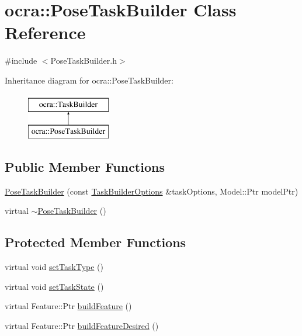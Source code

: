 \hypertarget{classocra_1_1PoseTaskBuilder}{}\section{ocra\+:\+:Pose\+Task\+Builder Class Reference}
\label{classocra_1_1PoseTaskBuilder}


{\ttfamily \#include $<$Pose\+Task\+Builder.\+h$>$}

Inheritance diagram for ocra\+:\+:Pose\+Task\+Builder\+:\begin{figure}[H]
\begin{center}
\leavevmode
\includegraphics[height=2.000000cm]{dc/d35/classocra_1_1PoseTaskBuilder}
\end{center}
\end{figure}
\subsection*{Public Member Functions}
\begin{DoxyCompactItemize}
\item 
\hyperlink{classocra_1_1PoseTaskBuilder_aee81134b7353f3ee147a6129a0a265a9}{Pose\+Task\+Builder} (const \hyperlink{classocra_1_1TaskBuilderOptions}{Task\+Builder\+Options} \&task\+Options, Model\+::\+Ptr model\+Ptr)
\item 
virtual \hyperlink{classocra_1_1PoseTaskBuilder_ad71d138985d6a4c6145818b5ab51b72a}{$\sim$\+Pose\+Task\+Builder} ()
\end{DoxyCompactItemize}
\subsection*{Protected Member Functions}
\begin{DoxyCompactItemize}
\item 
virtual void \hyperlink{classocra_1_1PoseTaskBuilder_aafc5b611352f7cbebecaa51cf534c68c}{set\+Task\+Type} ()
\item 
virtual void \hyperlink{classocra_1_1PoseTaskBuilder_a3bc6c07a3ee7656a1f3051500baddbd8}{set\+Task\+State} ()
\item 
virtual Feature\+::\+Ptr \hyperlink{classocra_1_1PoseTaskBuilder_a9a5cd51010fb610f00eea794e1f8f701}{build\+Feature} ()
\item 
virtual Feature\+::\+Ptr \hyperlink{classocra_1_1PoseTaskBuilder_a66fa4cdba48138741e19e642684a7006}{build\+Feature\+Desired} ()
\end{DoxyCompactItemize}
